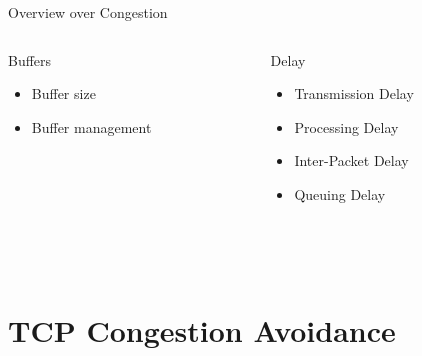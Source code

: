 \documentclass[english,aspectratio=43,t]{beamer}
\begin{document}
\begin{frame}{Overview over Congestion}
\begin{columns}
\begin{column}{0.5\textwidth}
	\begin{block}{Buffers}
		\begin{itemize}
		\item Buffer size
		\only<2->{\pgfsetfillopacity{1}}
		\item Buffer management
		\end{itemize}
	\end{block}
\end{column}

\begin{column}{0.5\textwidth}
	\begin{block}{Delay}
		\begin{itemize}
		\item Transmission Delay
		\item Processing Delay
		\item Inter-Packet Delay
		\only<2->{\pgfsetfillopacity{1}}
		\item Queuing Delay
		\end{itemize}
	\end{block}
\end{column}
\end{columns}
~\\~\\
\end{frame}

\section{TCP Congestion Avoidance}
\label{sec:ca}
\end{document}
